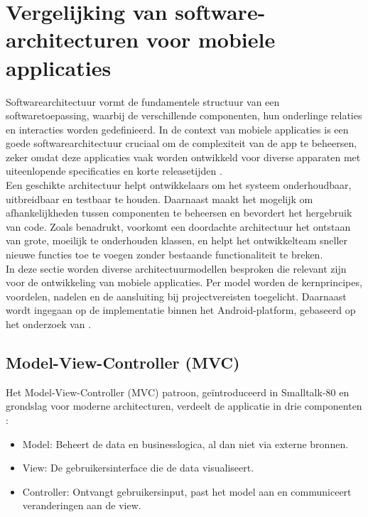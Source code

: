 \section{Vergelijking van software-architecturen voor mobiele applicaties}

Softwarearchitectuur vormt de fundamentele structuur van een softwaretoepassing, waarbij de verschillende componenten, hun onderlinge relaties en interacties worden gedefinieerd. In de context van mobiele applicaties is een goede softwarearchitectuur cruciaal om de complexiteit van de app te beheersen, zeker omdat deze applicaties vaak worden ontwikkeld voor diverse apparaten met uiteenlopende specificaties en korte releasetijden \autocite{Dobrean2019}. \\

Een geschikte architectuur helpt ontwikkelaars om het systeem onderhoudbaar, uitbreidbaar en testbaar te houden. Daarnaast maakt het mogelijk om afhankelijkheden tussen componenten te beheersen en bevordert het hergebruik van code. Zoals \textcite{Dobrean2019} benadrukt, voorkomt een doordachte architectuur het ontstaan van grote, moeilijk te onderhouden klassen, en helpt het ontwikkelteam sneller nieuwe functies toe te voegen zonder bestaande functionaliteit te breken.\\

In deze sectie worden diverse architectuurmodellen besproken die relevant zijn voor de ontwikkeling van mobiele applicaties. Per model worden de kernprincipes, voordelen, nadelen en de aansluiting bij projectvereisten toegelicht. Daarnaast wordt ingegaan op de implementatie binnen het Android-platform, gebaseerd op het onderzoek van \textcite{Lou2016}.\\

\subsection{Model-View-Controller (MVC)}
Het Model-View-Controller (MVC) patroon, geïntroduceerd in Smalltalk-80 en grondslag voor moderne architecturen, verdeelt de applicatie in drie componenten \autocite{Lou2016}:  
\begin{itemize}
	\item Model: Beheert de data en businesslogica, al dan niet via externe bronnen.  
	\item View: De gebruikersinterface die de data visualiseert.  
	\item Controller: Ontvangt gebruikersinput, past het model aan en communiceert veranderingen aan de view.  
\end{itemize}

